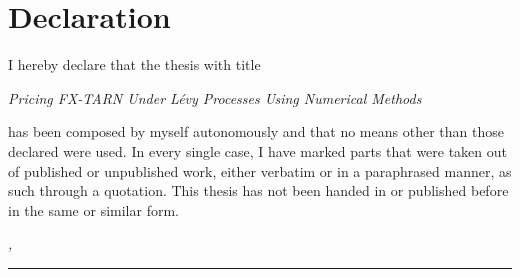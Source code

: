 %
\chapter*{Declaration}
\label{sec:declaration}
\thispagestyle{empty}

I hereby declare that the thesis with title
\begin{center}
\textit{Pricing FX-TARN Under L\'evy Processes Using Numerical Methods}
\end{center}
has been composed by myself autonomously and that no means other than those declared were used. In every single case, I have marked parts that were taken out of published or unpublished work, either verbatim or in a paraphrased manner, as such through a quotation.
This thesis has not been handed in or published before in the same or similar form.

\bigskip

\noindent\textit{\thesisUniversityCity, \thesisDate}

\smallskip

\begin{flushright}
	\begin{minipage}{5cm}
		\rule{\textwidth}{1pt}
		\centering\thesisName
	\end{minipage}
\end{flushright}

